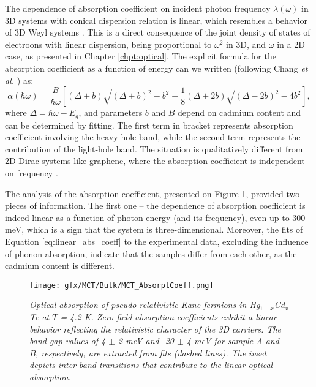\documentclass[titlepage,a4paper]{book}
\begin{document}
The dependence of absorption coefficient on incident photon frequency $\lambda (\omega)$ in 3D systems with conical dispersion relation is linear, which resembles a behavior of 3D Weyl systems \cite{Malcolm_MCT}. This is a direct consequence of the joint density of states of electroons with linear dispersion, being proportional to $\omega^2$ in 3D, and $\omega$ in a 2D case, as presented in Chapter \ref{chpt:optical}. The explicit formula for the absorption coefficient as a function of energy can we written (following Chang \textit{et al.} \cite{Chang_MCT_bulk}) as:
\begin{equation}
\label{eq:linear_abs_coeff}
\alpha (\hbar\omega) = \frac{B}{\hbar\omega} \left[ (\Delta + b)\sqrt{(\Delta+b)^2-b^2} + \frac{1}{8}(\Delta+2b)\sqrt{(\Delta-2b)^2-4b^2}\right],
\end{equation}
where $\Delta = \hbar\omega - E_g$, and parameters $b$ and $B$ depend on cadmium content and can be determined by fitting. The first term in bracket represents absorption coefficient involving the heavy-hole band, while the second term represents the contribution of the light-hole band. The situation is qualitatively different from 2D Dirac systems like graphene, where the absorption coefficient is independent on frequency \cite{Kuzmenko_MCTBulk}.

The analysis of the absorption coefficient, presented on Figure \ref{fig:Samples_MCT_AbsorptCoeff}, provided two pieces of information. The first one -- the dependence of absorption coefficient is indeed linear as a function of photon energy (and its frequency), even up to 300 meV, which is a sign that the system is three-dimensional. Moreover, the fits of Equation \ref{eq:linear_abs_coeff} to the experimental data, excluding the influence of phonon absorption, indicate that the samples differ from each other, as the cadmium content is different.

\begin{figure}[H]
	\centering
	\texttt{[image: gfx/MCT/Bulk/MCT\_AbsorptCoeff.png]}
	\vspace{-10pt}
	\caption{\textit{Optical absorption of pseudo-relativistic Kane fermions in Hg$_{1-x}$Cd$_x$Te at $T$ = 4.2 K. Zero field absorption coefficients exhibit a linear behavior reflecting the relativistic character of the 3D carriers. The band gap values of 4 $\pm$ 2 meV and -20 $\pm$ 4 meV for sample A and B, respectively, are extracted from fits (dashed lines). The inset depicts inter-band transitions that contribute to the linear optical absorption.}}	
\label{fig:Samples_MCT_AbsorptCoeff}
\end{figure} 
\end{document}
